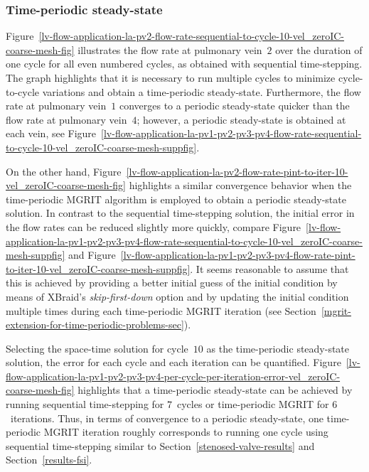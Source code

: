 \documentclass[3p]{elsarticle}
\begin{document}
\subsubsection{Time-periodic steady-state}
Figure~\ref{lv-flow-application-la-pv2-flow-rate-sequential-to-cycle-10-vel_zeroIC-coarse-mesh-fig}
illustrates the flow rate at pulmonary vein~$2$ over the duration of one cycle
for all even numbered cycles, as obtained with sequential time-stepping.
The graph highlights that it is necessary to run multiple cycles
to minimize cycle-to-cycle variations and obtain a time-periodic steady-state.
Furthermore, the flow rate at pulmonary vein~$1$ converges to a periodic steady-state quicker
than the flow rate at pulmonary vein~$4$; however, a periodic steady-state is obtained at each vein,
see Figure~\ref{lv-flow-application-la-pv1-pv2-pv3-pv4-flow-rate-sequential-to-cycle-10-vel_zeroIC-coarse-mesh-suppfig}.

On the other hand,
Figure~\ref{lv-flow-application-la-pv2-flow-rate-pint-to-iter-10-vel_zeroIC-coarse-mesh-fig}
highlights a similar convergence behavior when the time-periodic MGRIT algorithm is employed
to obtain a periodic steady-state solution.
In contrast to the sequential time-stepping solution,
the initial error in the flow rates can be reduced slightly more quickly,
compare Figure~\ref{lv-flow-application-la-pv1-pv2-pv3-pv4-flow-rate-sequential-to-cycle-10-vel_zeroIC-coarse-mesh-suppfig}
and Figure~\ref{lv-flow-application-la-pv1-pv2-pv3-pv4-flow-rate-pint-to-iter-10-vel_zeroIC-coarse-mesh-suppfig}.
It seems reasonable to assume that this is achieved by providing a better initial guess
of the initial condition by means of XBraid's \emph{skip-first-down} option
and by updating the initial condition multiple times during each time-periodic MGRIT iteration
(see Section~\ref{mgrit-extension-for-time-periodic-problems-sec}).

Selecting the space-time solution for cycle~$10$ as the time-periodic steady-state solution,
the error for each cycle and each iteration can be quantified.
Figure~\ref{lv-flow-application-la-pv1-pv2-pv3-pv4-per-cycle-per-iteration-error-vel_zeroIC-coarse-mesh-fig}
highlights that a time-periodic steady-state can be achieved
by running sequential time-stepping for $7$~cycles
or time-periodic MGRIT for $6$~iterations.
Thus, in terms of convergence to a periodic steady-state,
one time-periodic MGRIT iteration roughly corresponds to running one cycle using sequential time-stepping
similar to Section~\ref{stenosed-valve-results} and Section~\ref{results-fsi}.
\end{document}
